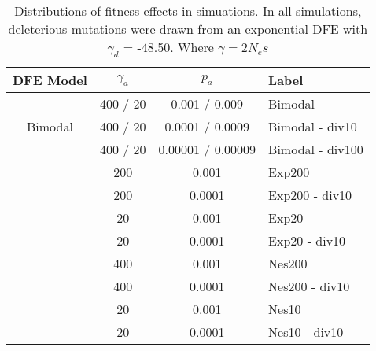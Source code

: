 


\begin{table}
\centering

\caption{Distributions of fitness effects in simuations. In all simulations, deleterious mutations were drawn from an exponential DFE with $\gamma_d$ = -48.50. Where $\gamma = 2N_es$}
 \begin{tabular}{c c c l} 

  \hline
  DFE Model & $\gamma_a$ & $p_a$ & Label \\ [0.5ex] 
 \hline
 \multirow{3}{*}{Bimodal} & 400 / 20 & 0.001 / 0.009 & Bimodal \\
 						 & 400 / 20 & 0.0001 / 0.0009 & Bimodal - div10 \\
 						 & 400 / 20  & 0.00001 / 0.00009  & Bimodal - div100 \\
 \hdashline
 \multirow{4}{*}{Exponential} & 200 & 0.001 & Exp200 \\
 						  & 200 & 0.0001 & Exp200 - div10\\
 						  & 20 & 0.001 & Exp20 \\
 						  & 20 & 0.0001 & Exp20 - div10 \\
  \hdashline						 
  \multirow{4}{*}{Fixed} & 400 & 0.001 & Nes200 \\
 						  & 400 & 0.0001 & Nes200 - div10 \\
 						  & 20 & 0.001 & Nes10 \\
 						  & 20 & 0.0001 & Nes10 - div10 \\
\hline

\end{tabular}    
    \label{tab:castaneusEstimates}

\end{table}
